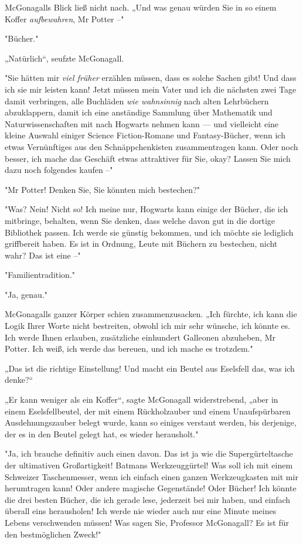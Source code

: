 {McGonagalls Blick ließ nicht nach. „Und was genau würden Sie in so einem Koffer \emph{aufbewahren}, Mr Potter --"

"Bücher."

„Natürlich“, seufzte McGonagall.

"Sie hätten mir \emph{viel früher} erzählen müssen, dass es solche Sachen gibt! Und dass ich sie mir leisten kann! Jetzt müssen mein Vater und ich die nächsten zwei Tage damit verbringen, alle Buchläden \emph{wie wahnsinnig} nach alten Lehrbüchern abzuklappern, damit ich eine anständige Sammlung über Mathematik und Naturwissenschaften mit nach Hogwarts nehmen kann --- und vielleicht eine kleine Auswahl einiger Science Fiction-Romane und Fantasy-Bücher, wenn ich etwas Vernünftiges aus den Schnäppchenkisten zusammentragen kann. Oder noch besser, ich mache das Geschäft etwas attraktiver für Sie, okay? Lassen Sie mich dazu noch folgendes kaufen --"

"Mr Potter! Denken Sie, Sie könnten mich bestechen?"

"Was? Nein! Nicht so! Ich meine nur, Hogwarts kann einige der Bücher, die ich mitbringe, behalten, wenn Sie denken, dass welche davon gut in die dortige Bibliothek passen. Ich werde sie günstig bekommen, und ich möchte sie lediglich griffbereit haben. Es ist in Ordnung, Leute mit Büchern zu bestechen, nicht wahr? Das ist eine --"

"Familientradition."

"Ja, genau."

McGonagalls ganzer Körper schien zusammenzusacken. „Ich fürchte, ich kann die Logik Ihrer Worte nicht bestreiten, obwohl ich mir sehr wünsche, ich könnte es. Ich werde Ihnen erlauben, zusätzliche einhundert Galleonen abzuheben, Mr Potter. Ich weiß, ich werde das bereuen, und ich mache es trotzdem."

„Das ist die richtige Einstellung! Und macht ein Beutel aus Eselsfell das, was ich denke?“

„Er kann weniger als ein Koffer“, sagte McGonagall widerstrebend, „aber in einem Eselsfellbeutel, der mit einem Rückholzauber und einem Unaufspürbaren Ausdehnungszauber belegt wurde, kann so einiges verstaut werden, bis derjenige, der es in den Beutel gelegt hat, es wieder herausholt."

"Ja, ich brauche definitiv auch einen davon. Das ist ja wie die Supergürteltasche der ultimativen Großartigkeit! Batmans Werkzeuggürtel! Was soll ich mit einem Schweizer Taschenmesser, wenn ich einfach einen ganzen Werkzeugkasten mit mir herumtragen kann! Oder andere magische Gegenstände! Oder Bücher! Ich könnte die drei besten Bücher, die ich gerade lese, jederzeit bei mir haben, und einfach überall eins herausholen! Ich werde nie wieder auch nur eine Minute meines Lebens verschwenden müssen! Was sagen Sie, Professor McGonagall? Es ist für den bestmöglichen Zweck!"

}
